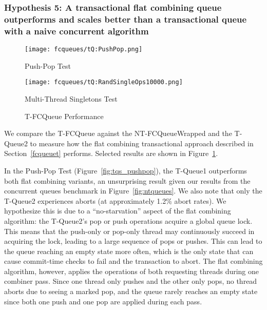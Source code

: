 \vspace{12pt}
\noindent{}

\subsubsection{Hypothesis 5: A transactional flat combining queue outperforms and scales better than a transactional queue with a naive concurrent algorithm}

\begin{figure}[t]
    \centering
	\begin{minipage}{0.45\textwidth}
	    \texttt{[image: fcqueues/tQ:PushPop.png]}
        \caption*{Push-Pop Test}
	\end{minipage}
   	\begin{minipage}{0.45\textwidth}
	    \texttt{[image: fcqueues/tQ:RandSingleOps10000.png]}
        \caption{Multi-Thread Singletons Test}
	\end{minipage}
        \caption{T-FCQueue Performance}
    \label{fig:tqs}
\end{figure}

We compare the T-FCQueue against the NT-FCQueueWrapped and the T-Queue2 to measure how the flat combining transactional approach described in Section~\ref{fcqueuet} performs. Selected results are shown in Figure~\ref{fig:tqs}.

In the Push-Pop Test (Figure~\ref{fig:tqs_pushpop}), the T-Queue1 outperforms both flat combining variants, an unsurprising result given our results from the concurrent queues benchmark in Figure~\ref{fig:ntqueues}. We also note that only the T-Queue2 experiences aborts (at approximately 1.2\% abort rates). We hypothesize this is due to a ``no-starvation'' aspect of the flat combining algorithm: the T-Queue2's pop or push operations acquire a global queue lock. This means that the push-only or pop-only thread may continuously succeed in acquiring the lock, leading to a large sequence of pops or pushes. This can lead to the queue reaching an empty state more often, which is the only state that can cause commit-time checks to fail and the transaction to abort. The flat combining algorithm, however, applies the operations of both requesting threads during one combiner pass. Since one thread only pushes and the other only pops, no thread aborts due to seeing a marked pop, and the queue rarely reaches an empty state since both one push and one pop are applied during each pass.

